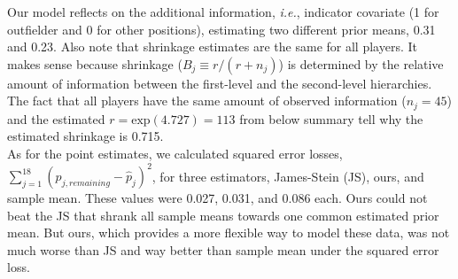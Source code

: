 \documentclass[article]{jss}
\begin{document}
Our model reflects on the additional information, \emph{i.e.}, indicator covariate (1 for outfielder and 0 for other positions), estimating two different prior means, 0.31 and 0.23. Also note that shrinkage estimates are the same for all players. It makes sense because shrinkage ($B_{j}\equiv r / (r+n_{j})$) is determined by the relative amount of information between the first-level and the second-level hierarchies. The fact that all players have the same amount of observed information ($n_{j}=45$) and the estimated $r=\textrm{exp}(4.727)=113$ from below summary tell why the estimated shrinkage is 0.715.
\\

As for the point estimates, we calculated squared error losses, $\sum_{j=1}^{18}(p_{j, remaining}-\hat{p}_{j})^{2}$, for three estimators, James-Stein (JS), ours, and sample mean. These values were 0.027, 0.031, and 0.086 each. Ours could not beat the JS that shrank all sample means towards one common estimated prior mean. But ours, which provides a more flexible way to model these data, was not much worse than JS and way better than sample mean under the squared error loss.
\\
\end{document}
